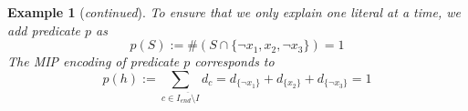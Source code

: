 \documentclass[twoside,11pt]{article}
\newcommand\m[1]{\mathcal{#1}}
\newtheorem{example}{Example}
\newcommand\comment[1]{\marginpar{\tiny #1}}
\renewcommand\comment[1]{#1}
\newcommand{\tias}[1]{{\comment{\color{blue}Tias:#1}}}
\newcommand{\emilio}[1]{{\comment{\color{red}Emilio: #1}}}
\newcommand{\bart}[1]{{\comment{\color{OliveGreen}Bart: #1}}}
\newcommand\decisionvariable{{d}}
\newcommand\Iend{\ensuremath{I_\mathit{end} }\xspace}
\newcommand\formula{\ensuremath{\m{F} }\xspace}
\newcommand\formulac{\ensuremath{\m{C} }\xspace}
\newcommand\mm[1]{\ensuremath{#1}\xspace}
\newcommand\call[1]{\mm{\texttt{#1}}}
\newcommand\comus{\mm{\call{OCUS}}}
\newcommand\onestep{\ensuremath{\call{Explain-One-Step}}\xspace}
\begin{document}
\begin{example}[\textit{continued}]
		To ensure that we only explain one literal at a time, we add predicate $p$ as
		\begin{equation}\label{eq:cost-function}
		p(S) := \# (S\cap \{\lnot x_1, x_2, \lnot x_3\})=1
		\end{equation}
	The MIP encoding of predicate $p$ corresponds to
		\begin{equation}
		p(h):= \sum_{c \in \overline{\Iend \setminus I}} d_c = \decisionvariable_{\{\lnot x_1\}} + \decisionvariable_{\{x_2\}} + \decisionvariable_{\{\lnot x_3\}} = 1
		\label{eq:exactly-one-constraint}
	\end{equation}		

\end{example}
\end{document}
